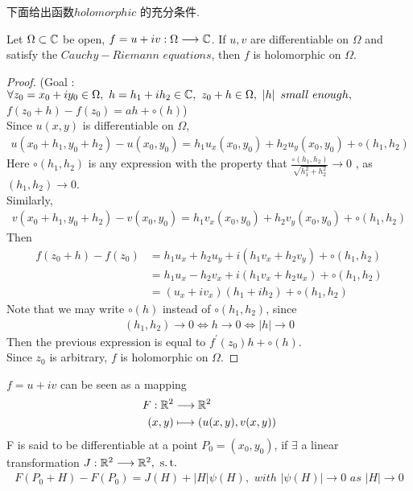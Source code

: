 \vspace{2em}
下面给出函数$holomorphic$ 的充分条件.
\begin{thm}\label{thm 2.4.1}
	Let $\Omega \subset \mathbb{C}$ be open, $f = u + iv : \Omega \longrightarrow \mathbb{C}$. If $u , v$ are differentiable on $\Omega$ and satisfy the $Cauchy-Riemann \,\, equations$, then $f$ is holomorphic on $\Omega$.
	
	\vspace{2em}
	\begin{proof}
		(Goal : $\forall z_0 = x_0 + i y_0 \in \Omega , \,\, h = h_1 + i h_2 \in \mathbb{C} , \,\, z_0 + h \in \Omega , \,\, \left| h \right| \,\, small \,\, enough , $\\
		$f(z_0+  h) - f(z_0) = ah + \circ(h)$)\\
		
		\vspace{1em}
		Since $u(x , y)$ is differentiable on $\Omega$, 
		\begin{align}
			u(x_0 + h_1 , y_0 + h_2) - u(x_0 , y_0) = h_1 u_x(x_0 , y_0) + h_2 u_y(x_0 , y_0) + \circ(h_1 , h_2)
		\end{align}
		Here $\circ(h_1 , h_2)$ is any expression with the property that $\frac{\circ(h_1 , h_2)}{\sqrt{h_{1}^2 + h_{2}^2}} \to 0$ , as $(h_1 , h_2) \to 0$.\\
		Similarly, 
		\begin{align}
			v(x_0 + h_1 , y_0 + h_2) - v(x_0 , y_0) = h_1 v_x(x_0 , y_0) + h_2 v_y(x_0 , y_0) + \circ(h_1 , h_2)
		\end{align}
		Then
		\begin{align}
			f(z_0 + h) - f(z_0) 
			&= h_1 u_x + h_2 u_y + i (h_1 v_x + h_2 v_y) + \circ(h_1 , h_2) \\
			&= h_1 u_x - h_2 v_x + i (h_1 v_x + h_2 u_x) + \circ(h_1 , h_2) \\
			&= (u_x + i v_x)(h_1 + i h_2) + \circ(h_1 , h_2)
		\end{align}
		Note that we may write $\circ(h)$ instead of $\circ(h_1 , h_2)$, since
		\begin{align}
			(h_1 , h_2) \to 0 \Leftrightarrow h \to 0 \Leftrightarrow \left| h \right| \to 0
		\end{align}
		Then the previous expression is equal to $f^{'}(z_0)h + \circ(h)$.\\
		Since $z_0$ is arbitrary, $f$ is holomorphic on $\Omega$.
	\end{proof}
\end{thm}

\newpage
$f = u + iv$ can be seen as a mapping
\begin{align}
	F : \mathbb{R}^2 &\longrightarrow \mathbb{R}^2 \\
	(x , y) &\longmapsto (u(x , y) , v(x , y))
\end{align}
F is said to be differentiable at a point $P_0 = (x_0 , y_0)$, if $\exists$ a linear transformation $J : \mathbb{R}^2 \longrightarrow \mathbb{R}^2 , \,\, \operatorname{s.t.}$
\begin{align}
	F(P_0 + H) - F(P_0) = J(H) + \left| H \right| \psi(H) , \,\, with \,\, \left| \psi(H) \right| \to 0 \,\, as \,\, \left| H \right| \to 0
\end{align}

